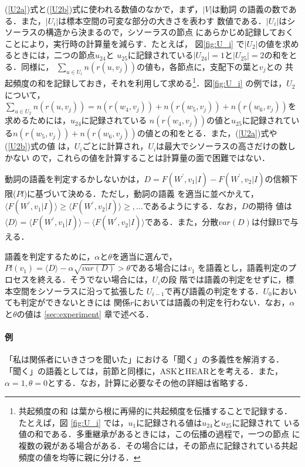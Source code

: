 (\ref{U2a})式と(\ref{U2b})式に使われる数値のなかで，まず，$|V|$は動詞
の語義の数である．また，$|U_i|$は標本空間の可変な部分の大きさを表わす
数値である．$|U_i|$はシソーラスの構造から決まるので，シソーラスの節点
にあらかじめ記録しておくことにより，実行時の計算量を減らす．たとえば，
図\ref{fig:U_i} で$|U_2|$の値を求めるときには，二つの節点$u_{24}$と
$u_{25}$に記録されている$|U_{24}|=1$と$|U_{25}|=2$の和をとる．同様に，
$\sum_{u \in U_i} n(r(u,v_j))$の値も，各節点に，支配下の葉と$v_j$との
共起頻度の和を記録しておき，それを利用して求める\footnote{共起頻度の和
は葉から根に再帰的に共起頻度を伝播することで記録する．たとえば，図
\ref{fig:U_i} では，$u_1$に記録される値は$u_{24}$と$u_{25}$に記録されて
いる値の和である．多重継承があるときには，この伝播の過程で，一つの節点
に複数の親がある場合がある．その場合には，その節点に記録されている共起
頻度の値を均等に親に分ける．}．図\ref{fig:U_i} の例では，$U_2$について，
$\sum_{u \in U_2} n(r(u,v_j)) = n(r(w_4,v_j)) + n(r(w_5,v_j)) +
n(r(w_6,v_j))$を求めるためには，$u_{24}$に記録されている
$n(r(w_4,v_j))$の値と$u_{25}$に記録されている$n(r(w_5,v_j)) +
n(r(w_6,v_j))$の値との和をとる．また，(\ref{U2a})式や(\ref{U2b})式の値
は，$U_i$ごとに計算され，$U_i$は最大でシソーラスの高さだけの数しかない
ので，これらの値を計算することは計算量の面で困難ではない．

動詞の語義を判定するかしないかは，$D = F(W^\prime,v_1|I) -
F(W^\prime,v_2|I)$の信頼下限($Pl$)に基づいて決める．ただし，動詞の語義
を適当に並べかえて，$\langle F(W^\prime,v_1|I) \rangle \ge \langle
F(W^\prime,v_2|I) \rangle \ge,\ldots$であるようにする．なお，$D$の期待
値は$\langle D \rangle = \langle F(W^\prime,v_1|I) \rangle - \langle
F(W^\prime,v_2|I) \rangle$である．また，分散$var(D)$は付録Bで与える．

語義を判定するために，$\alpha$と$\theta$を適当に選んで，$Pl(v_1) =
\langle D \rangle - \alpha \sqrt{var(D)} > \theta$である場合には$v_1$
を語義とし，語義判定のプロセスを終える．そうでない場合には，$U_i$の段
階では語義の判定をせずに，標本空間をシソーラスに沿って拡張した
$U_{i-1}$で再び語義の判定をする．$U_0$においても判定ができないときには
関係$r$においては語義の判定を行わない．なお，$\alpha$と$\theta$の値は
\ref{sec:experiment} 章で述べる．

\paragraph{例}

「私は関係者にいきさつを聞いた」における「聞く」の多義性を解消する．
「聞く」の語義としては，前節と同様に，ASKとHEARとを考える．また，
$\alpha=1,\theta=0$とする．なお，計算に必要なその他の詳細は省略する．

